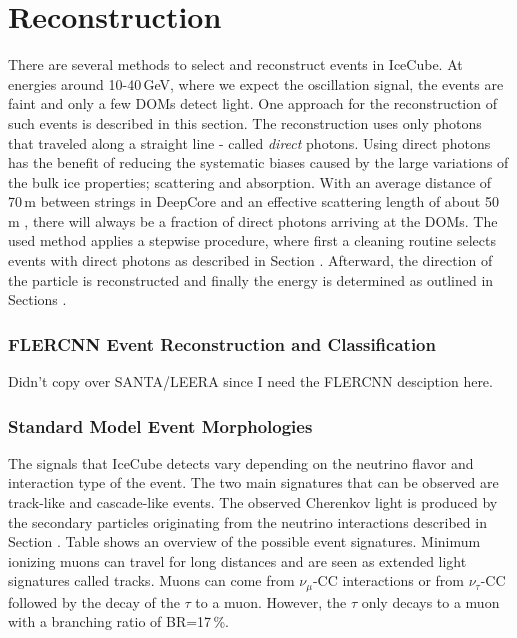 \section{Reconstruction} 

There are several methods to select and reconstruct events in IceCube.
At energies around 10-40\,GeV, where we expect the oscillation signal, the events are faint and only a few DOMs detect light.
One approach for the reconstruction of such events is described in this section.
The reconstruction uses only photons that traveled along a straight line - called \textit{direct} photons.
Using direct photons has the benefit of reducing the systematic biases caused by the large variations of the bulk ice properties; scattering and absorption.
With an average distance of 70\,m between strings in DeepCore and an effective scattering length of about 50\,m , there will always be a fraction of direct photons arriving at the DOMs.
The used method applies a stepwise procedure, where first a cleaning routine selects events with direct photons as described in Section . 
Afterward, the direction of the particle is reconstructed and finally the energy is determined as outlined in Sections .


\subsubsection{FLERCNN Event Reconstruction and Classification} 

Didn't copy over SANTA/LEERA since I need the FLERCNN desciption here.


\subsubsection{Standard Model Event Morphologies}

The signals that IceCube detects vary depending on the neutrino flavor and interaction type of the event.
The two main signatures that can be observed are track-like and cascade-like events.
The observed Cherenkov light is produced by the secondary particles originating from the neutrino interactions described in Section .
Table  shows an overview of the possible event signatures.
Minimum ionizing muons can travel for long distances and are seen as extended light signatures called tracks.
Muons can come from $\nu_\mu$-CC interactions or from $\nu_\tau$-CC followed by the decay of the $\tau$ to a muon.
However, the $\tau$ only decays to a muon with a branching ratio of BR=17\,\%.


